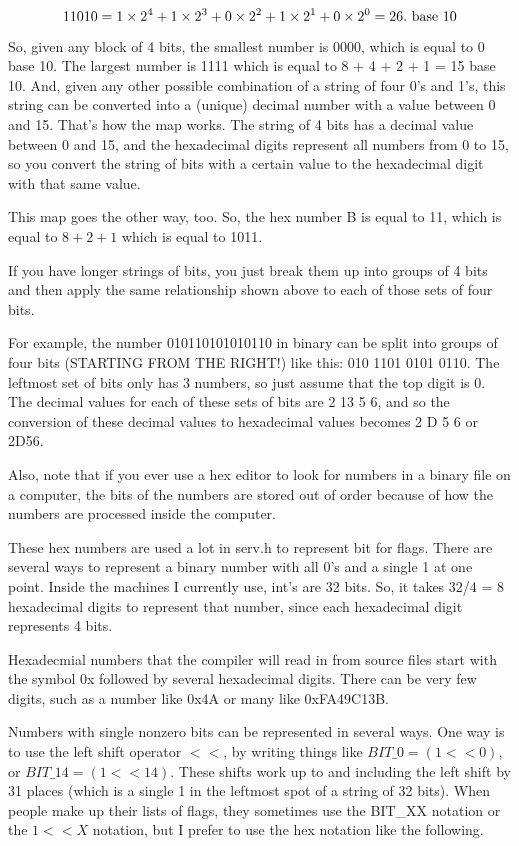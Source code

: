 $$11010 = 1 \times 2^{4} + 1 \times 2^{3} + 0 \times 2^{2} + 1\times 2^{1} + 0\times 2^{0} = 26. \hbox{ base 10}$$

So, given any block of 4 bits, the smallest number is 0000, which is
equal to 0 base 10. The largest number is 1111 which is equal to 8 + 4
+ 2 + 1 = 15 base 10. And, given any other possible combination of a
string of four 0's and 1's, this string can be converted into a
(unique) decimal number with a value between 0 and 15. That's how the
map works. The string of 4 bits has a decimal value between 0 and 15,
and the hexadecimal digits represent all numbers from 0 to 15, so you
convert the string of bits with a certain value to the hexadecimal
digit with that same value.


This map goes the other way, too. So, the hex number B is equal to 11,
which is equal to $8 + 2+ 1$ which is equal to 1011.

If you have longer strings of bits, you just break them up into groups
of 4 bits and then apply the same relationship shown above to each of
those sets of four bits.

For example, the number 010110101010110 in binary can be split into
groups of four bits (STARTING FROM THE RIGHT!) like this: 010 1101
0101 0110. The leftmost set of bits only has 3 numbers, so just assume
that the top digit is 0. The decimal values for each of these
sets of bits are 2 13 5 6, and so the conversion of these decimal
values to hexadecimal values becomes 2 D 5 6 or 2D56. 

Also, note that if you ever use a hex editor to look for numbers in a
binary file on a computer, the bits of the numbers are 
stored out of order because of how the numbers are processed
inside the computer.


These hex numbers are used a lot in serv.h to represent bit for
flags. There are several ways to represent a binary number with all
0's and a single 1 at one point. Inside the machines I currently use,
int's are 32 bits. So, it takes 32/4 = 8 hexadecimal digits to 
represent that number, since each hexadecimal digit represents 4
bits.

Hexadecmial numbers that the compiler will read in from source
files start with the symbol 0x followed by several hexadecimal
digits. There can be very few digits, such as a number like
0x4A or many like 0xFA49C13B. 

Numbers with single nonzero bits can be represented in several ways.
One way is to use the left shift operator $<<$, by writing things like
 $BIT\_0 = (1 << 0)$, or $BIT\_14 = (1 << 14)$. These shifts work up
to and including the left shift by 31 places (which is a single 1 in the
leftmost spot of a string of 32 bits). When people make up their lists
of flags, they sometimes use the BIT\_XX notation or the $1<<X$ notation,
but I prefer to use the hex notation like the following.

